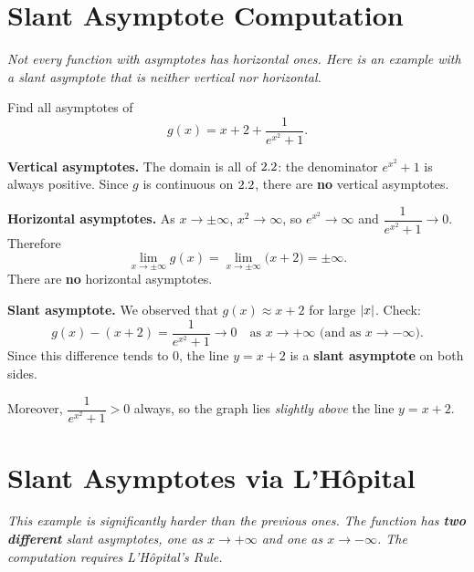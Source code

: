 \section{Slant Asymptote Computation}
\label{sec:6.17}

\textit{Not every function with asymptotes has horizontal ones.  Here is an example with a slant asymptote that is neither vertical nor horizontal.}

\begin{example}
\label{ex:6-15}
Find all asymptotes of
\[
  g(x) = x + 2 + \frac{1}{e^{x^{2}} + 1}.
\]

\textbf{Vertical asymptotes.}  The domain is all of $2.2$: the denominator $e^{x^{2}}+1$ is always positive.  Since $g$ is continuous on $2.2$, there are \textbf{no} vertical asymptotes.

\textbf{Horizontal asymptotes.}  As $x \to \pm\infty$, $x^{2} \to \infty$, so $e^{x^{2}} \to \infty$ and $\dfrac{1}{e^{x^{2}}+1} \to 0$.  Therefore
\[
  \lim_{x \to \pm\infty}g(x) = \lim_{x \to \pm\infty}\bigl(x+2\bigr) = \pm\infty.
\]
There are \textbf{no} horizontal asymptotes.

\textbf{Slant asymptote.}  We observed that $g(x) \approx x+2$ for large $\left\lvert x \right\rvert$.  Check:
\[
  g(x) - (x+2) = \frac{1}{e^{x^{2}}+1} \to 0 \quad \text{as } x \to +\infty \text{ (and as } x \to -\infty\text{)}.
\]
Since this difference tends to $0$, the line $y = x + 2$ is a \textbf{slant asymptote} on both sides.

Moreover, $\dfrac{1}{e^{x^{2}}+1} > 0$ always, so the graph lies \emph{slightly above} the line $y = x+2$.
\end{example}

\section{Slant Asymptotes via L'H\^opital}
\label{sec:6.18}

\textit{This example is significantly harder than the previous ones.  The function has \textbf{two different} slant asymptotes, one as $x \to +\infty$ and one as $x \to -\infty$.  The computation requires L'H\^opital's Rule.}

